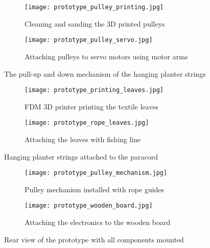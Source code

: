 \begin{appendices}
\begin{figure}[htbp]
    \centering
    \begin{subfigure}{0.48\textwidth}
        \centering
        \texttt{[image: prototype\_pulley\_printing.jpg]}
        \caption{Cleaning and sanding the 3D printed pulleys}
        \label{fig:pulley-sanding}
    \end{subfigure}
    \hfill
    \begin{subfigure}{0.48\textwidth}
        \centering
        \texttt{[image: prototype\_pulley\_servo.jpg]}
        \caption{Attaching pulleys to servo motors using motor arms}
        \label{fig:pulley-servo}
    \end{subfigure}
    \caption{The pull-up and down mechanism of the hanging planter strings}
    \label{fig:prototype-pulley}
\end{figure}

\begin{figure}[htbp]
    \centering
    \begin{subfigure}{0.48\textwidth}
        \centering
        \texttt{[image: prototype\_printing\_leaves.jpg]}
        \caption{FDM 3D printer printing the textile leaves}
        \label{fig:printing-leaves}
    \end{subfigure}
    \hfill
    \begin{subfigure}{0.48\textwidth}
        \centering
        \texttt{[image: prototype\_rope\_leaves.jpg]}
        \caption{Attaching the leaves with fishing line }
        \label{fig:attaching-leaves}
    \end{subfigure}
    \caption{Hanging planter strings attached to the paracord}
    \label{fig:prototype-leaves}
\end{figure}

\begin{figure}[htbp]
    \centering
    \begin{subfigure}{0.48\textwidth}
        \centering
        \texttt{[image: prototype\_pulley\_mechanism.jpg]}
        \caption{Pulley mechanism installed with rope guides}
        \label{fig:pulley-small}
    \end{subfigure}
    \hfill
    \begin{subfigure}{0.48\textwidth}
        \centering
        \texttt{[image: prototype\_wooden\_board.jpg]}
        \caption{Attaching the electronics to the wooden board}
        \label{fig:pulley-large}
    \end{subfigure}
    \caption{Rear view of the prototype with all components mounted}
    \label{fig:prototype-board}
\end{figure}


\end{appendices}
